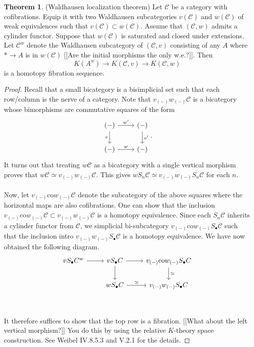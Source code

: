 \documentclass[10pt,letterpaper,cm]{nupset}
\theoremstyle{definition}
\theoremstyle{theorem}
\newtheorem{theorem}{Theorem}
\theoremstyle{remark}
\newcommand{\1}{\mathbf{1}}
\renewcommand{\c}{\mathscr{C}}
\newcommand{\0}{\vec 0}
\begin{document}
\begin{theorem}{(Waldhausen localization theorem)}
Let $\c$ be a category with cofibrations. Equip it with two Waldhausen subcategories $v(\c)$ and $w(\c)$ of weak equivalences such that $v(\c) \subset w(\c)$. Assume that $(\c, w)$ admits a cylinder functor. Suppose that $w(\c)$ is saturated and closed under extensions. Let $\c^w$ denote the Waldhausen subcategory of $(\c, v)$ consisting of any $A$ where $\ast \to A$ is in $w(\c)$ {[[Are the initial morphisms the only w.e.?]]}. Then $$ K(A^w) \to K(\c, v) \to K(\c, w) $$ is a homotopy fibration sequence.
\end{theorem}
\begin{proof}
Recall that a small bicategory is a bisimplicial set such that each row/column is the nerve of a category. Note that $v_{(-)}w_{(-)}\c$ is a bicategory whose bimorphisms are commutative squares of the form
\[
\begin{tikzcd}
(-) \arrow[r, "w'"] \arrow[d, "v"'] & (-) \arrow[d, "v'"] \\
(-) \arrow[r, "w"] & (-)
\end{tikzcd}.
\]
It turns out that treating $w \c$ as a bicategory with a single vertical morphism proves that $w \c \simeq v_{(-)}w_{(-)}\c$. This gives $wS_n \c \simeq v_{(-)}w_{(-)}S_n\c$ for each $n$.
\\ \\ Now, let $v_{(-)}\text{co}w_{(-)}\c$ denote the subcategory of the above squares where the horizontal maps are also cofibrations. One can show that the inclusion $v_{(-)}\text{co}w_{(-)}\c \subset v_{(-)}w_{(-)}\c$ is a homotopy equivalence. Since each $S_n \c$ inherits a cylinder functor from $\c$, we simplicial bi-subcategory $v_{(-)}\text{co}w_{(-)}S_{\bullet}\c$ such that the inclusion intro $v_{(-)}w_{(-)}S_{\bullet}\c$ is a homotopy equivalence. We have now obtained the following diagram.
\[
\begin{tikzcd}
vS_{\bullet}C^w \arrow[r] & vS_{\bullet}C \arrow[r] \arrow[d] & v_{(-)}\text{co}w_{(-)}S_{\bullet}C \arrow[d, "\simeq"] \\
 & wS_{\bullet}C \arrow[r, "\simeq"] & v_{(-)}w_{(-)}S_{\bullet}C
\end{tikzcd}
\]
\\ \\ It therefore suffices to show that the top row is a fibration. {[[What about the left vertical morphism?]]} You do this by using the relative $K$-theory space construction. See Weibel IV.8.5.3 and V.2.1 for the details.
\end{proof}
\end{document}
